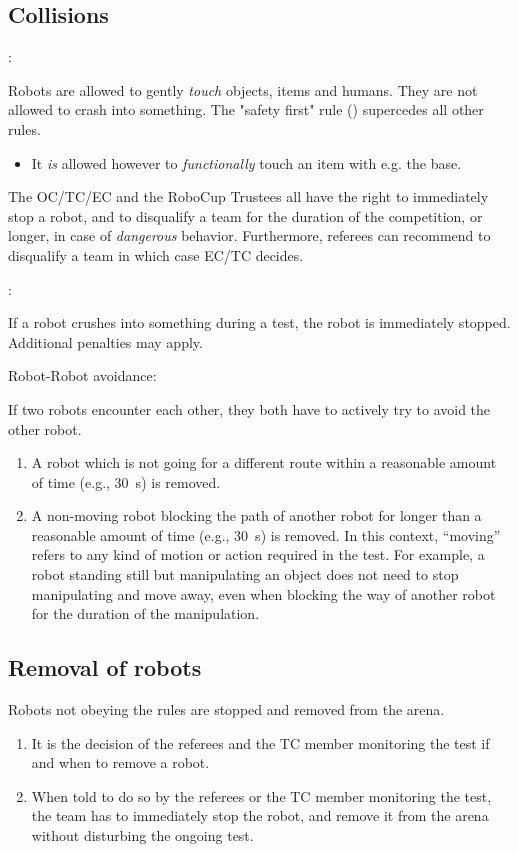 \subsection{Collisions}
\begin{enumerate}
  {\bf\item {}:} Robots are allowed to gently \emph{touch} objects, items and humans. 
  They are not allowed to crash into something. 
  The "safety first" rule () supercedes all other rules.
  \begin{itemize}
   \item It \emph{is} allowed however to \emph{functionally} touch an item with e.g. the base.
  \end{itemize}
  The OC/TC/EC and the RoboCup Trustees all have the right to immediately stop a robot, and to disqualify a team for the 
  duration of the competition, or longer, in case of \emph{dangerous} behavior. 
  Furthermore, referees can recommend to disqualify a team in which case EC/TC decides.
  {\bf\item {}:} If a robot crushes into something during a test, the robot is immediately stopped.
  Additional penalties may apply. 
  {\bf\item Robot-Robot avoidance:} If two robots encounter each other, they both have to actively try to avoid the other robot.
  \begin{enumerate}
  \item A robot which is not going for a different route 
    within a reasonable amount of time (e.g., \SI{30}{\second}) is removed.
  \item A non-moving robot blocking the path of another robot 
    for longer than a reasonable amount of time (e.g., \SI{30}{\second}) is removed.
    In this context, ``moving'' refers to any kind of motion or action required in the test. 
    For example, a robot standing still but manipulating an object does 
    not need to stop manipulating and move away, even when blocking the way
    of another robot for the duration of the manipulation.
  \end{enumerate}
\end{enumerate}



\subsection{Removal of robots}\label{rule:robot_removal}
Robots not obeying the rules are stopped and removed from the arena.
\begin{enumerate}
\item It is the decision of the referees and the TC member monitoring the test if and when to remove a robot.
\item When told to do so by the referees or the TC member monitoring the test, the team has to immediately stop the robot,
  and remove it from the arena without disturbing the ongoing test.
\end{enumerate}


